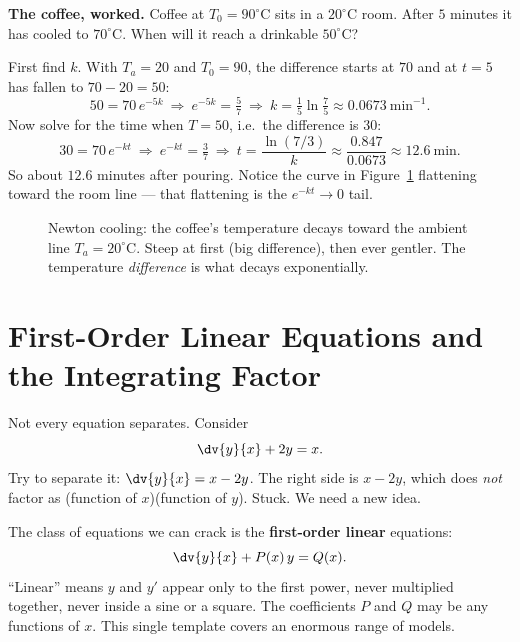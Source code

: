 \begin{applicationbox}
\textbf{The coffee, worked.} Coffee at $T_0 = 90^\circ$C sits in a $20^\circ$C room.
After $5$ minutes it has cooled to $70^\circ$C. When will it reach a drinkable
$50^\circ$C?

First find $k$. With $T_{\!a}=20$ and $T_0=90$, the difference starts at $70$ and at
$t=5$ has fallen to $70-20=50$:
\[
  50 = 70\,e^{-5k}\ \Rightarrow\ e^{-5k}=\tfrac{5}{7}\ \Rightarrow\
  k = \tfrac{1}{5}\ln\tfrac{7}{5}\approx 0.0673\ \text{min}^{-1}.
\]
Now solve for the time when $T=50$, i.e.\ the difference is $30$:
\[
  30 = 70\,e^{-kt}\ \Rightarrow\ e^{-kt}=\tfrac{3}{7}\ \Rightarrow\
  t = \frac{\ln(7/3)}{k}\approx \frac{0.847}{0.0673}\approx 12.6\ \text{min}.
\]
So about $12.6$ minutes after pouring. Notice the curve in
Figure~\ref{ch37:cooling} flattening toward the room line --- that flattening is the
$e^{-kt}\to 0$ tail.
\end{applicationbox}

\begin{figure}[H]
\centering
{}
\caption{Newton cooling: the coffee's temperature decays toward the ambient line
$T_a=20^\circ$C. Steep at first (big difference), then ever gentler. The temperature
\emph{difference} is what decays exponentially.}
\label{ch37:cooling}
\end{figure}

\section{First-Order Linear Equations and the Integrating Factor}

Not every equation separates. Consider
\[
  \dv{y}{x} + 2y = x.
\]
Try to separate it: $\dv{y}{x} = x - 2y$. The right side is $x-2y$, which does
\emph{not} factor as (function of $x$)(function of $y$). Stuck. We need a new idea.

The class of equations we can crack is the \textbf{first-order linear} equations:
\[
  \dv{y}{x} + P(x)\,y = Q(x).
\]
``Linear'' means $y$ and $y'$ appear only to the first power, never multiplied
together, never inside a sine or a square. The coefficients $P$ and $Q$ may be any
functions of $x$. This single template covers an enormous range of models.

